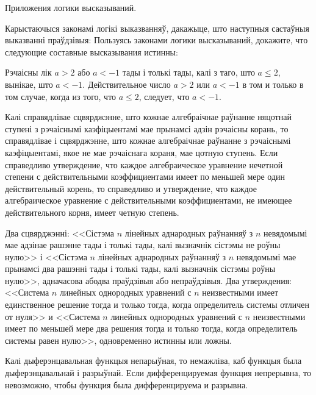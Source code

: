 \documentclass[12pt, a4paper]{article}
\begin{document}
{Приложения логики высказываний.}

\begin{problemList}

\problemItemSimple
{Карыстаючыся законамі логікі выказванняў, дакажыце, што наступныя састаўныя выказванні праўдзівыя:}
{Пользуясь законами логики высказываний, докажите, что следующие составные высказывания истинны:}

\begin{belarusianEnumerate}

\problemItemSimple
{Рэчаісны лік $a > 2$ або $a < -1$ тады і толькі тады, калі з таго, што $a \le 2$, вынікае, што $a < -1$.}
{Действительное число $a > 2$ или $a < -1$ в том и только в том случае, когда из того, что $a \le 2$, следует, что $a < -1$.}

\problemItemSimple
{Калі справядлівае сцвярджэнне, што кожнае алгебраічнае раўнанне няцотнай ступені з рэчаіснымі каэфіцыентамі
мае прынамсі адзін рэчаісны корань, то справядлівае і сцвярджэнне, што кожнае алгебраічнае раўнанне з рэчаіснымі каэфіцыентамі,
якое не мае рэчаіснага кораня, мае цотную ступень.}
{Если справедливо утверждение, что каждое алгебраическое уравнение нечетной степени с действительными коэффициентами
имеет по меньшей мере один действительный корень, то справедливо и утверждение, что каждое алгебраическое уравнение
с действительными коэффициентами, не имеющее действительного корня, имеет четную степень.}

\problemItemSimple
{Два сцвярджэнні: <<Сістэма $n$ лінейных аднародных раўнанняў з $n$ невядомымі мае адзінае рашэнне тады і толькі тады,
калі вызначнік сістэмы не роўны нулю>> і <<Сістэма $n$ лінейных аднародных раўнанняў з $n$ невядомымі мае прынамсі два рашэнні
тады і толькі тады, калі вызначнік сістэмы роўны нулю>>, адначасова абодва праўдзівыя або непраўдзівыя.}
{Два утверждения: <<Система $n$ линейных однородных уравнений с $n$ неизвестными имеет единственное решение тогда и только тогда,
когда определитель системы отличен от нуля>> и <<Система $n$ линейных однородных уравнений с $n$ неизвестными имеет
по меньшей мере два решения тогда и только тогда, когда определитель системы равен нулю>>, одновременно истинны или ложны.}

\problemItemSimple
{Калі дыферэнцавальная функцыя непарыўная, то немажліва, каб функцыя была дыферэнцавальнай і разрыўнай.}
{Если дифференцируемая функция непрерывна, то невозможно, чтобы функция была дифференцируема и разрывна.}


\end{belarusianEnumerate}
\end{problemList}
\end{document}
